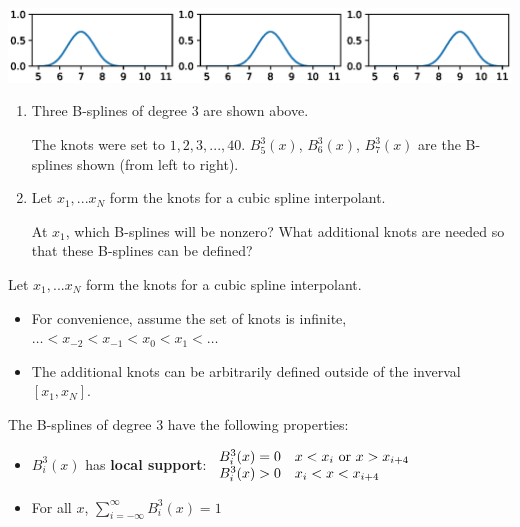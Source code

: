 \documentclass[12pt,letterpaper,noanswers]{exam}
\begin{document}
\includegraphics[width=\textwidth]{img/C10bsplinecubes.eps}

\begin{enumerate}[resume=classQ]
\item Three B-splines of degree $3$ are shown above.  

The knots were set to $1,2,3,...,40$.  $B_5^3(x)$, $B_6^3(x)$, $B_7^3(x)$ are the B-splines shown (from left to right).
\item Let $x_1, ... x_N$ form the knots for a cubic spline interpolant.

At $x_1$, which B-splines will be nonzero?  What additional knots are needed so that these B-splines can be defined?
\vspace{1in}

\end{enumerate}
\begin{tcolorbox}
Let $x_1, ... x_N$ form the knots for a cubic spline interpolant.
\begin{itemize}
\itemsep0pt
    \item For convenience, assume the set of knots is infinite, $\hdots < x_{-2} < x_{-1}< x_0 < x_1 < \hdots$
    \item The additional knots can be arbitrarily defined outside of the inverval $[x_1, x_N]$.
\end{itemize}
\end{tcolorbox}
\begin{tcolorbox}
The B-splines of degree $3$ have the following properties:
\begin{itemize}
    \item $B_i^3(x)$ has \textbf{local support}: $ \begin{array}{l l}
    B_i^3(x) = 0 & x<x_i \text{ or }x>x_{i+4} \\
    B_i^3(x) >0 & x_i < x < x_{i+4}
    \end{array}$
        \item For all $x$, $\displaystyle\sum\limits_{i=-\infty}^\infty B_i^3(x) = 1$
    \end{itemize}
\end{tcolorbox}
\end{document}
